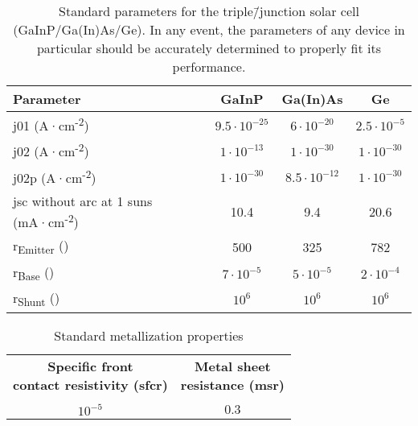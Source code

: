 \setlength{\extrarowheight}{10pt}
\setlength{\belowrulesep}{0.1ex}
\begin{table}[h]
	\centering
	\caption[Standard parameters for the triple\=/junction solar cell (GaInP/Ga(In)As/Ge).]{Standard parameters for the triple\=/junction solar cell (GaInP/Ga(In)As/Ge). In any event, the parameters of any device in particular should be accurately determined to properly fit its performance.}
	\label{tab:AppA_Param}
	\begin{tabularx}{\textwidth}{Xccc}
	\toprule[\thicktopline]
	\vspace{-0.3cm}\textbf{Parameter} & \textbf{GaInP} & \textbf{Ga(In)As} & \textbf{Ge}\\
	\toprule[\thicktopline]
	\gls{j01} (A·cm\textsuperscript{-2}) & $9.5 \cdot 10^{-25}$ & $6 \cdot 10^{-20}$ & $2.5 \cdot 10^{-5}$\\
	\gls{j02} (A·cm\textsuperscript{-2}) & $1 \cdot 10^{-13}$ & $1 \cdot 10^{-30}$ & $1 \cdot 10^{-30}$\\
	\gls{j02p} (A·cm\textsuperscript{-2}) & $1 \cdot 10^{-30}$ & $8.5 \cdot 10^{-12}$ & $1 \cdot 10^{-30}$\\
	\gls{jsc} without \gls{arc} at 1 \gls{suns} (mA·cm\textsuperscript{-2}) & 10.4 & 9.4 & 20.6\\
	r\textsubscript{Emitter} (\unitssr) & 500 & 325 & 782\\
	r\textsubscript{Base} (\unitsscr) & $7 \cdot 10^{-5}$ & $5 \cdot 10^{-5}$ & $2 \cdot 10^{-4}$\\
	r\textsubscript{Shunt} (\unitsscr) & $10^{6}$ & $10^{6}$ & $10^{6}$\\
	\bottomrule[\thickbottomline]
	\end{tabularx}
\end{table}
\setlength{\belowrulesep}{0.65ex}

\setlength{\extrarowheight}{7pt}
\begin{table}[h]
	\centering
	\caption[Standard metallization properties]{Standard metallization properties}
	\label{tab:AppA_MetalParam}
	\begin{tabularx}{0.6\textwidth}{cc}
	\toprule[\thicktopline]
	 \makecell[c]{\textbf{Specific front} \\ \textbf{contact resistivity (\gls{sfcr})}} & \makecell[c]{\textbf{Metal sheet} \\ \textbf{resistance (\gls{msr})}}\\
	\unitsscr & \unitssr\\
	\toprule[\thicktopline]
	$10^{-5}$ & $0.3$\\
	\bottomrule[\thickbottomline]
	\end{tabularx}
\end{table}

